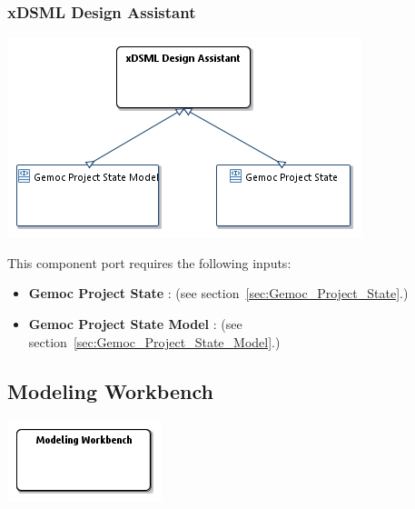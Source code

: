\documentclass{gemoc} %
\begin{document}
\subsubsection{xDSML Design Assistant}
\label{sec:xDSML_Design_Assistant}
\begin{center}
\includegraphics*[trim=0.0cm 0.0cm 0cm 0.0cm, clip=true]{../images/generated/Generated_xDSML_Design_Assistant.png}
\end{center}

This component port requires the following inputs:
\begin{itemize}
  \item \textbf{Gemoc Project State} :
(see section~\ref{sec:Gemoc_Project_State}.)
  \item \textbf{Gemoc Project State Model} :
(see section~\ref{sec:Gemoc_Project_State_Model}.)
\end{itemize}




\subsection{Modeling Workbench}
\label{sec:Modeling_Workbench}
\begin{center}
\includegraphics*[trim=0.0cm 0.0cm 0cm 0.0cm, clip=true]{../images/generated/Generated_Modeling_Workbench.png}
\end{center}
\end{document}
